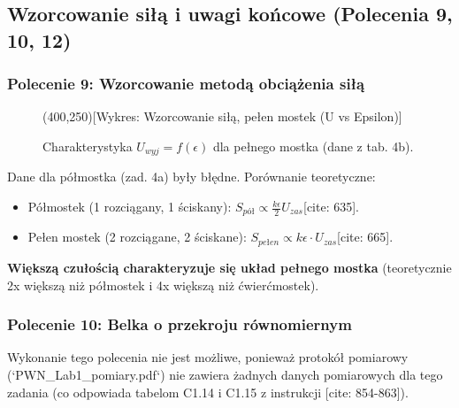 \documentclass[12pt, a4paper]{article}
\begin{document}
	\subsection{Wzorcowanie siłą i uwagi końcowe (Polecenia 9, 10, 12)}
	
	\subsubsection*{Polecenie 9: Wzorcowanie metodą obciążenia siłą}
	
	\begin{figure}[H]
		\centering
		\framebox(400,250){[Wykres: Wzorcowanie siłą, pełen mostek (U vs Epsilon)]}
		\caption{Charakterystyka $U_{wyj} = f(\epsilon)$ dla pełnego mostka (dane z tab. 4b).}
	\end{figure}
	
	Dane dla półmostka (zad. 4a) były błędne. Porównanie teoretyczne:
	\begin{itemize}
		 \item Półmostek (1 rozciągany, 1 ściskany): $S_{pół} \propto \frac{k\epsilon}{2} U_{zas}$[cite: 635].
		 \item Pełen mostek (2 rozciągane, 2 ściskane): $S_{pełen} \propto k\epsilon \cdot U_{zas}$[cite: 665].
	\end{itemize}
	\textbf{Większą czułością charakteryzuje się układ pełnego mostka} (teoretycznie 2x większą niż półmostek i 4x większą niż ćwierćmostek).
	
	\subsubsection*{Polecenie 10: Belka o przekroju równomiernym}
	 Wykonanie tego polecenia nie jest możliwe, ponieważ protokół pomiarowy (`PWN\_Lab1\_pomiary.pdf`) nie zawiera żadnych danych pomiarowych dla tego zadania (co odpowiada tabelom C1.14 i C1.15 z instrukcji [cite: 854-863]).
	
\end{document}
